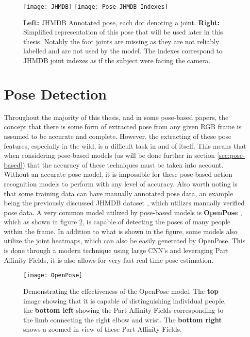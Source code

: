 \begin{figure}[ht]
	\texttt{[image: JHMDB]}
	\texttt{[image: Pose JHMDB Indexes]}
	\centering
	\caption{\textbf{Left:} JHMDB Annotated pose, each dot denoting a joint. \textbf{Right:} Simplified representation of this pose that will be used later in this thesis. Notably the foot joints are missing as they are not reliably labelled and are not used by the model. The indexes correspond to JHMDB joint indexes as if the subject were facing the camera.}
	\label{fig:JHMDB}
\end{figure}

\section{Pose Detection}
\label{sec:pose-detection}

Throughout the majority of this thesis, and in some pose-based papers, the concept that there is some form of extracted pose from any given RGB frame is assumed to be accurate and complete. However, the extracting of these pose features, especially in the wild, is a difficult task in and of itself. This means that when considering pose-based models (as will be done further in section \ref{sec:pose-based}) that the accuracy of these techniques must be taken into account. Without an accurate pose model, it is impossible for these pose-based action recognition models to perform with any level of accuracy. Also worth noting is that some training data can have manually annotated pose data, an example being the previously discussed JHMDB dataset \cite{JHMDB}, which utilizes manually verified pose data. A very common model utilized by pose-based models is \textbf{OpenPose} \cite{openpose}, which as shown in figure \ref{fig:openpose}, is capable of detecting the poses of many people within the frame. In addition to what is shown in the figure, some models also utilize the joint heatmaps, which can also be easily generated by OpenPose. This is done through a modern technique using large CNN's and leveraging Part Affinity Fields, it is also allows for very fast real-time pose estimation.

\begin{figure}[ht]
	\texttt{[image: OpenPose]}
	\centering
	\caption{Demonstrating the effectiveness of the OpenPose \cite{openpose} model. The \textbf{top} image showing that it is capable of distinguishing individual people, the \textbf{bottom left} showing the Part Affinity Fields corresponding to the limb connecting the right elbow and wrist. The \textbf{bottom right} shows a zoomed in view of these Part Affinity Fields.}
	\label{fig:openpose}
\end{figure}

